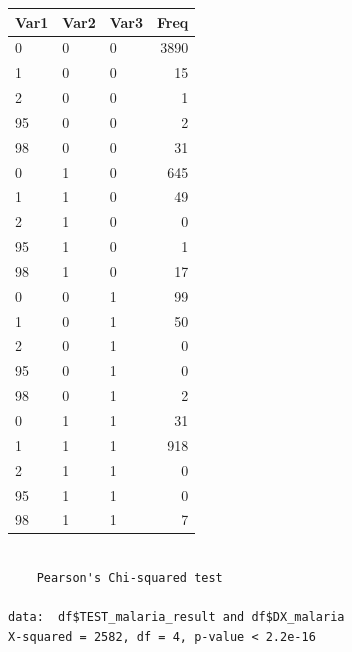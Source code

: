 \documentclass[
  letterpaper,
  DIV=11,
  numbers=noendperiod,
  oneside]{scrreprt}
\newenvironment{Shaded}{\begin{snugshade}}{\end{snugshade}}
\newcommand{\FunctionTok}[1]{\textcolor[rgb]{0.28,0.35,0.67}{#1}}
\newcommand{\NormalTok}[1]{\textcolor[rgb]{0.00,0.23,0.31}{#1}}
\newcommand{\SpecialCharTok}[1]{\textcolor[rgb]{0.37,0.37,0.37}{#1}}
\begin{document}
\begin{longtable}[]{@{}lllr@{}}
\toprule()
Var1 & Var2 & Var3 & Freq \\
\midrule()
\endhead
0 & 0 & 0 & 3890 \\
1 & 0 & 0 & 15 \\
2 & 0 & 0 & 1 \\
95 & 0 & 0 & 2 \\
98 & 0 & 0 & 31 \\
0 & 1 & 0 & 645 \\
1 & 1 & 0 & 49 \\
2 & 1 & 0 & 0 \\
95 & 1 & 0 & 1 \\
98 & 1 & 0 & 17 \\
0 & 0 & 1 & 99 \\
1 & 0 & 1 & 50 \\
2 & 0 & 1 & 0 \\
95 & 0 & 1 & 0 \\
98 & 0 & 1 & 2 \\
0 & 1 & 1 & 31 \\
1 & 1 & 1 & 918 \\
2 & 1 & 1 & 0 \\
95 & 1 & 1 & 0 \\
98 & 1 & 1 & 7 \\
\bottomrule()
\end{longtable}

\begin{Shaded}
\end{Shaded}

\begin{verbatim}

    Pearson's Chi-squared test

data:  df$TEST_malaria_result and df$DX_malaria
X-squared = 2582, df = 4, p-value < 2.2e-16
\end{verbatim}

\begin{Shaded}
\end{Shaded}
\end{document}
